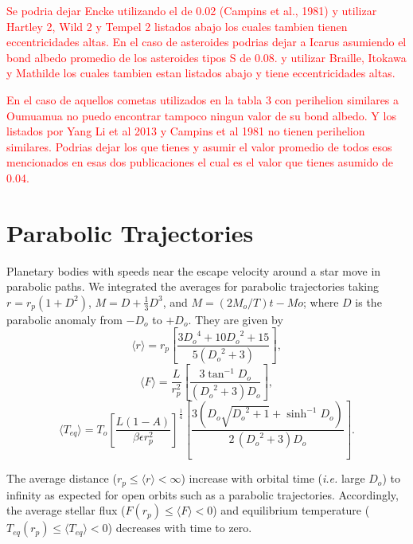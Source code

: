 \documentclass[a4paper,fleqn,usenatbib]{mnras}
\newcommand{\fix}{\textcolor{red}}
\begin{document}
\fix{Se podria dejar Encke utilizando el de 0.02 (Campins et al., 1981) y  utilizar Hartley 2, Wild 2 y Tempel 2 listados abajo los cuales tambien tienen eccentricidades altas.  En el caso de asteroides podrias dejar a Icarus asumiendo el bond albedo promedio de los asteroides tipos S de 0.08. y utilizar Braille, Itokawa y Mathilde los cuales tambien estan listados abajo y tiene eccentricidades altas.}

\fix{En el caso de aquellos cometas utilizados en la tabla 3 con perihelion similares a Oumuamua no puedo encontrar tampoco ningun valor de su bond albedo.  Y los listados por Yang Li et al 2013 y Campins et al 1981 no tienen perihelion similares.  Podrias dejar los que tienes y asumir el valor promedio de todos esos mencionados en esas dos publicaciones el cual es el valor que tienes asumido de 0.04.}



\section{Parabolic Trajectories}
\label{sec:parabolic}
Planetary bodies with speeds near the escape velocity around a star move in parabolic paths. We integrated the averages for parabolic trajectories taking $r=r_p(1+D^2)$, $M=D+\frac{1}{3}D^3$, and $M=(2M_o/T)t-Mo$; where $D$ is the parabolic anomaly from $-D_o$ to $+D_o$. They are given by
\begin{equation} \label{eq:rp}
\langle r \rangle = r_p \left[ \frac{3 {D_o}^{4} + 10 {D_o}^{2} + 15}{5 \left({D_o}^{2} + 3\right)} \right],
\end{equation}
\begin{equation} \label{eq:Fp}
\langle F \rangle = \frac{L}{r_p^2} \left[ \frac{3 \tan^{-1} D_o}{{\left({D_o}^2 + 3\right)} D_o} \right],
\end{equation}
\begin{equation} \label{eq:Tp}
\langle T_{eq} \rangle = T_o \left[\frac{L {\left(1 - A\right)}}{\beta \epsilon r_p^{2}}\right]^{\frac{1}{4}} \left[ \frac{3 {\left(D_o\sqrt{{D_o}^{2} + 1} + \sinh^{-1} D_o \right)}}{2 \, {\left({D_o}^{2} + 3\right)} D_o} \right].
\end{equation}

The average distance ($r_p \leq \langle r \rangle < \infty$) increase with orbital time (\emph{i.e.} large $D_o$) to infinity as expected for open orbits such as a parabolic trajectories. Accordingly, the average stellar flux ($F(r_p) \leq \langle F \rangle < 0$) and equilibrium temperature ($T_{eq}(r_p) \leq \langle T_{eq} \rangle < 0$) decreases with time to zero.
\end{document}
